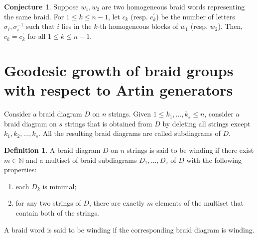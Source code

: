 \documentclass[11pt]{amsart}
\theoremstyle{plain}
\theoremstyle{definition}
\newtheorem{conjecture}[Theorem]{Conjecture}
\newtheorem{definition}[Theorem]{Definition}
\numberwithin{equation}{section}
\begin{document}
\begin{conjecture}\label{Wreathlikeconjecture}
Suppose $w_1,w_2$ are two homogeneous braid words representing the same braid. For $1 \leq k \leq n-1$, let $c_k$ (resp. $c_k^\prime$) be the number of letters $\sigma_i, \sigma_i^{-1}$ such that $i$ lies in the $k$-th homogeneous blocks of $w_1$ (resp. $w_2$). Then, $c_k = c_k^\prime$ for all $1 \leq k \leq n-1$.
\end{conjecture}

\section{Geodesic growth of braid groups with respect to Artin generators}

Consider a braid diagram $D$ on $n$ strings. Given $1 \leq k_1, \ldots, k_s \leq n$, consider a braid diagram on $s$ strings that is obtained from $D$ by deleting all strings except $k_1, k_2, \ldots, k_s$. All the resulting braid diagrams are called subdiagrams of $D$.

\begin{definition}
A braid diagram $D$ on $n$ strings is said to be winding if there exist $m \in \mathbb{N}$ and a multiset of braid subdiagrams $D_1, \ldots, D_s$ of $D$ with the following properties:
\begin{enumerate}
\item each $D_k$ is minimal;
\item for any two strings of $D$, there are exactly $m$ elements of the multiset that contain both of the strings.
\end{enumerate}
A braid word is said to be winding if the corresponding braid diagram is winding.
\end{definition}
\end{document}
